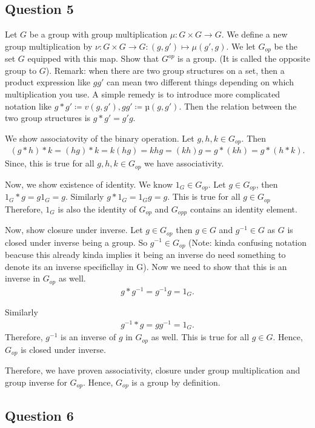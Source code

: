 \subsection{Question 5}
Let \( G \) be a group with group multiplication \( \mu : G \times  G \to  G\). We define a 
new group multiplication by \( \nu : G \times G \to G : \left( g,g' \right) \mapsto \mu \left( g', g \right)\). We let \( G_{op} \) be the set \( G \) equipped with this map.
Show that \( G^{op}  \) is a group. (It is called the opposite group to \( G \)). Remark:
when there are two group structures on a set, then a product expression like \( gg'  \) can mean two
different things depending on which multiplication you use. A simple remedy is to introduce
more complicated notation like \( g  *  g' \coloneqq  v(g, g' ), gg' \coloneqq  µ(g, g' ) \). Then the relation between the
two group structures is \( g * g'  = g' g \).

\begin{solution}
We show associatovity of the binary operation. 
Let \( g, h, k \in G_{op} \). Then
\begin{align*}
  \left( g * h \right) * k = (hg) * k
  = k(hg)
  = khg
  = \left(kh  \right)g
  = g * \left(kh  \right)
  = g * \left(h * k  \right)
.\end{align*}
Since, this is true for all \( g,h,k \in G_{op}  \) we have associativity.

Now, we show existence of identity. We know \( 1_{G} \in G_{op} \). Let \( g \in G_{op} \), then 
\( 1_{G} * g = g1_{G} = g \). Similarly \( g * 1_{G} = 1_{G}g = g \). This is true for all \( g \in G_{op} \) Therefore, 
\( 1_{G} \) is also the identity of \( G_{op} \) and \( G_{opp} \) contains an identity element.


Now, show closure under inverse. Let \( g \in G_{op}  \) then \( g \in  G    \) and \( g^{-1} \in G \) as \( G \) is closed under
inverse being a group. So \( g^{-1} \in G_{op} \) (Note: kinda confusing notation beacuse this already 
kinda implies it being an inverse do need something to denote its an inverse specificllay in G). 
Now we need to show that this is an inverse in \( G_{op} \) as well.
\begin{align*}
   g * g^{-1} = g^{-1} g = 1_{G}
.\end{align*}

Similarly
\begin{align*}
   g^{-1} * g = gg^{-1} = 1_{G}
.\end{align*}
Therefore, \( g^{-1} \) is an inverse of \( g \) in \( G_{op} \) as well. This is true for all \( g \in G \).
Hence, \( G_{op} \) is closed under inverse.

Therefore, we have proven associativity, closure under group multiplication and group inverse for \( G_{op} \). 
Hence, \( G_{op} \) is a group by definition.
\end{solution}

\subsection{Question 6}


